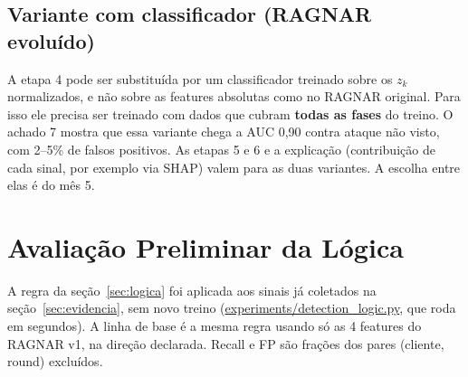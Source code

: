 \documentclass[11pt,a4paper]{article}
\newcommand{\res}{../fl-robustness-lab/results}
\begin{document}
\subsection{Variante com classificador (RAGNAR evoluído)}
\label{sec:varB}
A etapa 4 pode ser substituída por um classificador treinado sobre os $z_k$ normalizados, e não sobre as
features absolutas como no RAGNAR original. Para isso ele precisa ser treinado com dados que cubram
\textbf{todas as fases} do treino. O achado 7 mostra que essa variante chega a AUC 0,90 contra ataque não
visto, com 2--5\% de falsos positivos. As etapas 5 e 6 e a explicação (contribuição de cada sinal, por
exemplo via SHAP) valem para as duas variantes. A escolha entre elas é do mês 5.

\section{Avaliação Preliminar da Lógica}
\label{sec:avaliacao}

A regra da seção~\ref{sec:logica} foi aplicada aos sinais já coletados na seção~\ref{sec:evidencia}, sem
novo treino (\url{experiments/detection_logic.py}, que roda em segundos). A linha de base é a mesma
regra usando só as 4 features do RAGNAR v1, na direção declarada. Recall e FP são frações dos pares
(cliente, round) excluídos.

\begin{table}[htbp]
\centering
\caption{Regra sem treino: AUC do escore instantâneo $S$ e recall e falsos positivos da decisão final
(com CUSUM). Acima, os 8 ataques usados ao desenhar a regra; abaixo, os 5 ataques recentes, implementados
com a regra já congelada (fora da amostra).}
\label{tab:logica}
\resizebox{\textwidth}{!}{}
\end{table}
\end{document}
